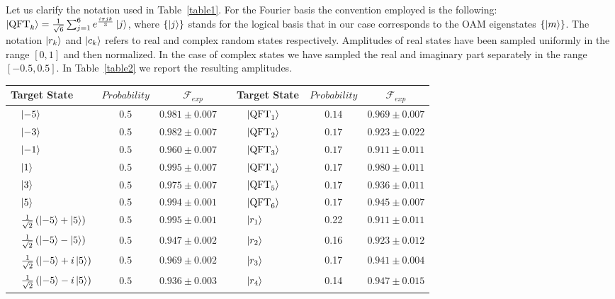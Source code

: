 Let us clarify the notation used in Table~\ref{table1}. For the Fourier basis the convention employed is the following: $\ket{\operatorname{QFT}_k}=\frac{1}{\sqrt{6}}\sum_{j=1}^{6}e^{\frac{ i \pi jk }{3}}\ket{j}$, where $\{\ket{j}\}$ stands for the logical basis that in our case corresponds to the OAM eigenstates $\{\ket{m} \}$. The notation $\ket{r_k}$ and $\ket{c_k}$ refers to real and complex random states respectively. Amplitudes of real states have been sampled uniformly in the range $\left[0,1\right]$ and then normalized. In the case of complex states we have sampled the real and imaginary part separately in the range $\left[-0.5,0.5\right]$. In Table~\ref{table2} we report the resulting amplitudes.
\begin{table}[h!]
\centering\footnotesize
\begin{tabular}{lcc|lcc}
\toprule
Target State & $Probability$  & $\mathcal{F}_{exp}$  & Target State & $Probability$  & $\mathcal{F}_{exp}$ \\
\midrule
 $\quad\ket{-5}$ & $0.5$  & $0.981 \pm 0.007\quad$ &$\quad\ket{\operatorname{QFT}_1}\qquad $ & $0.14$ & $0.969\pm 0.007$\\
 $\quad\ket{-3}$ & $0.5$ & $0.982 \pm 0.007\quad$ &$\quad\ket{\operatorname{QFT}_2}$ & $0.17$ & $0.923\pm 0.022$ \\
 $\quad\ket{-1}$ & $0.5$ & $0.960 \pm 0.007\quad$ &$\quad\ket{\operatorname{QFT}_3}$ & $0.17$ & $0.911\pm 0.011$\\ 
 $\quad\ket{1}$ & $0.5$ & $0.995 \pm 0.007\quad$ & $\quad\ket{\operatorname{QFT}_4}$&$0.17$ &  $0.980\pm 0.011$ \\
 $\quad\ket{3}$ & $0.5$ & $0.975 \pm 0.007\quad$ & $\quad\ket{\operatorname{QFT}_5 }$& $0.17$& $0.936\pm 0.011$ \\
 $\quad\ket{5}$ & $0.5$ & $0.994 \pm 0.001\quad$ & $\quad\ket{\operatorname{QFT}_6} $& $0.17$ & $0.945\pm 0.007$ \\
 $\quad\frac{1}{\sqrt{2}}\left(\ket{-5}+\ket{5} \right)$ & $0.5$  & $0.995 \pm 0.001\quad$ &$\quad\ket{r_1}$ & 0.22& $0.911\pm0.011$\\
 $\quad\frac{1}{\sqrt{2}}\left(\ket{-5}-\ket{5}\right)$ & $0.5$ & $0.947 \pm 0.002\quad$ &$\quad\ket{r_2}$  & 0.16 & $0.923 \pm 0.012$\\
 $\quad\frac{1}{\sqrt{2}}\left(\ket{-5}+i\ket{5}\right)$ & $0.5$ & $0.969 \pm 0.002\quad$ &$\quad\ket{r_3}$  & 0.17 & $0.941 \pm 0.004$\\ 
  $\quad\frac{1}{\sqrt{2}}\left(\ket{-5}-i\ket{5}\right)$ & $0.5$ & $0.936 \pm 0.003\quad$&$\quad\ket{r_4} $& 0.14 &$0.947 \pm 0.015$  \\

\end{tabular}
\end{table}
